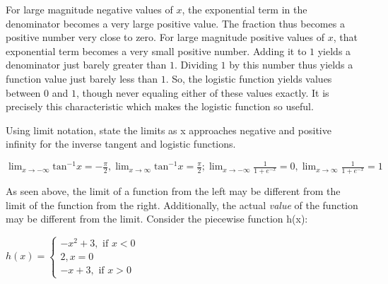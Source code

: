 
For large magnitude negative values of $x$, the exponential term in the denominator becomes a very large positive value. The fraction thus becomes a positive number very close to zero. For large magnitude positive values of $x$, that exponential term becomes a very small positive number. Adding it to $1$ yields a denominator just barely greater than $1$. Dividing $1$ by this number thus yields a function value just barely less than $1$. So, the logistic function yields values between $0$ and $1$, though never equaling either of these values exactly. It is precisely this characteristic which makes the logistic function so useful.

\begin{Exercise}[title=Limits Practice 3, label=limits3]
Using limit notation, state the limits as x approaches negative and positive infinity for the inverse tangent and logistic functions.
  \vspace{40mm}
\end{Exercise}
\begin{Answer}[ref=limits3] 
	$ \lim_{x \rightarrow -\infty} \text{tan}^{-1}x = -\frac{\pi}{2}, \lim_{x \rightarrow \infty} \text{tan}^{-1}x = \frac{\pi}{2}; \lim_{x \rightarrow -\infty} \frac{1}{1 + e^{-x}} = 0, \lim_{x \rightarrow \infty} \frac{1}{1 + e^{-x}} = 1 $
\end{Answer}

As seen above, the limit of a function from the left may be different from the limit of the function from the right. Additionally, the actual \textit{value} of the function may be different from the limit. Consider the piecewise function h(x):

$h(x) = \begin{cases}
    -x^2+3, \text{ if } x < 0\\
    2, x=0\\
    -x+3, \text{ if } x > 0
\end{cases}$

